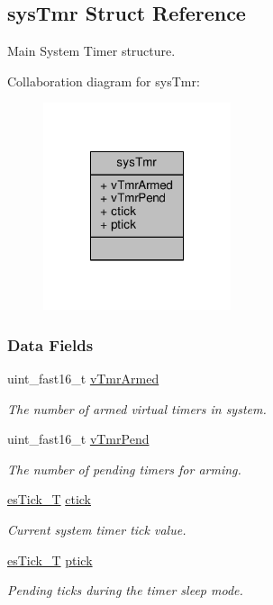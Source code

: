 \hypertarget{structsysTmr}{\subsection{sys\-Tmr Struct Reference}
\label{structsysTmr}
}


Main System Timer structure.  




Collaboration diagram for sys\-Tmr\-:\nopagebreak
\begin{figure}[H]
\begin{center}
\leavevmode
\includegraphics[width=156pt]{structsysTmr__coll__graph}
\end{center}
\end{figure}
\subsubsection*{Data Fields}
\begin{DoxyCompactItemize}
\item 
uint\-\_\-fast16\-\_\-t \hyperlink{structsysTmr_a3fb347fcb0b2bda6795f5dd8c4413873}{v\-Tmr\-Armed}
\begin{DoxyCompactList}\small\item\em The number of armed virtual timers in system. \end{DoxyCompactList}\item 
uint\-\_\-fast16\-\_\-t \hyperlink{structsysTmr_a63badc568f8fde1dd566e1f456aab008}{v\-Tmr\-Pend}
\begin{DoxyCompactList}\small\item\em The number of pending timers for arming. \end{DoxyCompactList}\item 
\hyperlink{group__kern__intf_ga844873888c186ee81eb66620dadb0451}{es\-Tick\-\_\-\-T} \hyperlink{structsysTmr_a1f1fac425438fad41278db9f2865d0a3}{ctick}
\begin{DoxyCompactList}\small\item\em Current system timer tick value. \end{DoxyCompactList}\item 
\hyperlink{group__kern__intf_ga844873888c186ee81eb66620dadb0451}{es\-Tick\-\_\-\-T} \hyperlink{structsysTmr_a338f10146bdac2bdd69447fca0fe75f8}{ptick}
\begin{DoxyCompactList}\small\item\em Pending ticks during the timer sleep mode. \end{DoxyCompactList}\end{DoxyCompactItemize}


